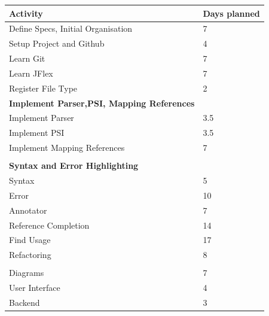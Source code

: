 \begin{center}
    \begin{tabular}{ | l | l |}
    \hline
     \textbf{Activity} & \textbf{Days planned}  \\ \hline
    Define Specs, Initial Organisation & 7     \\ \hline
    Setup Project and Github & 4   \\ \hline
    Learn Git & 7  \\ \hline
    Learn JFlex & 7 \\ \hline
    Register File Type & 2 \\ \hline
    \textbf {Implement Parser,PSI, Mapping References} & \\ \hline
    Implement Parser & 3.5\\ \hline
    Implement PSI & 3.5\\ \hline
    Implement Mapping References & 7\\ \hline
    & \\ \hline
    \textbf{Syntax and Error Highlighting} &\\ \hline
    Syntax & 5 \\ \hline
    Error & 10 \\ \hline
    Annotator & 7 \\ \hline
    Reference Completion & 14 \\ \hline
    Find Usage & 17 \\ \hline
    Refactoring & 8 \\ \hline
    & \\ \hline
    Diagrams & 7 \\ \hline
    User Interface & 4 \\ \hline
    Backend & 3 \\ \hline
    \end{tabular}
\end{center}


